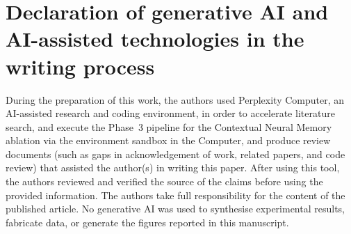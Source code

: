 \documentclass[final,3p,times,twocolumn]{elsarticle}
\begin{document}
	\section*{Declaration of generative AI and AI-assisted technologies in the
	writing process}
	During the preparation of this work, the authors used Perplexity Computer, an
	AI-assisted research and coding environment, in order to accelerate literature
	search, and execute the Phase~3 pipeline for the Contextual Neural Memory
	ablation via the environment sandbox in the Computer, and produce review documents
	(such as gaps in acknowledgement of work, related papers, and code review) that
	assisted the author(s) in writing this paper. After using this tool, the
	authors reviewed and verified the source of the claims before using the
	provided information. The authors take full responsibility for the content of the
	published article. No generative AI was used to synthesise experimental
	results, fabricate data, or generate the figures reported in this manuscript.

	
	
\end{document}
